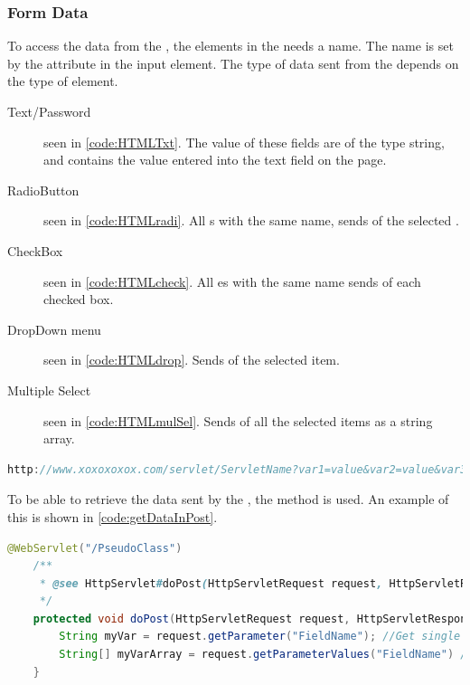 \subsubsection{Form Data}
To access the data from the , the elements in the  needs a name. The name is set by the  attribute in the input element. The type of data sent from the  depends on the type of element.
\begin{description}
	\item[Text/Password] seen in \autoref{code:HTMLTxt}. The value of these fields are of the type string, and contains the value entered into the text field on the page.
	\item[RadioButton] seen in \autoref{code:HTMLradi}. All s with the same name, sends  of the selected .
	\item[CheckBox] seen in \autoref{code:HTMLcheck}. All es with the same name sends  of each checked box.
	\item[DropDown menu] seen in \autoref{code:HTMLdrop}. Sends  of the selected item.
	\item[Multiple Select] seen in \autoref{code:HTMLmulSel}. Sends  of all the selected items as a string array.
\end{description}

\begin{lstlisting}[language=Java,label=code:URLLINK,caption=URL with visible parameters]
http://www.xoxoxoxox.com/servlet/ServletName?var1=value&var2=value&var3=value
\end{lstlisting}

To be able to retrieve the data sent by the , the  method is used. An example of this is shown in \autoref{code:getDataInPost}.
\begin{Code}
\begin{lstlisting}[language=Java,label=code:getDataInPost,caption=How to read parameters]
	@WebServlet("/PseudoClass")
	/**
	 * @see HttpServlet#doPost(HttpServletRequest request, HttpServletResponse response)
	 */
	protected void doPost(HttpServletRequest request, HttpServletResponse response) throws ServletException, IOException {
		String myVar = request.getParameter("FieldName"); //Get single Value
		String[] myVarArray = request.getParameterValues("FieldName") //Get string array
	}
\end{lstlisting}
\end{Code}

